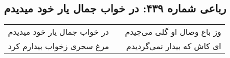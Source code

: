 \begin{center}
\section*{رباعی شماره ۴۳۹: در خواب جمال یار خود میدیدم}
\label{sec:sh439}
\begin{longtable}{l p{0.5cm} r}
در خواب جمال یار خود میدیدم
&&
وز باغ وصال او گلی می‌چیدم
\\
مرغ سحری زخواب بیدارم کرد
&&
ای کاش که بیدار نمی‌گردیدم
\\
\end{longtable}
\end{center}

